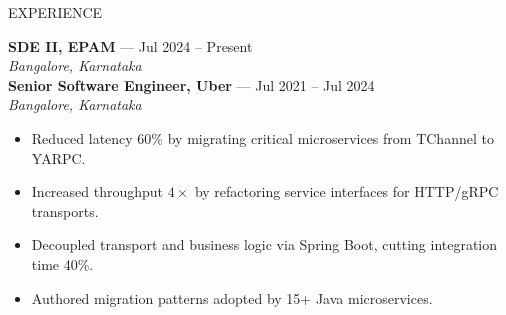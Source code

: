 \documentclass{resume} %
\begin{document}
\begin{rSection}{EXPERIENCE}

\textbf{SDE II, EPAM} --- Jul 2024 -- Present\\
\textit{Bangalore, Karnataka}\\

\textbf{Senior Software Engineer, Uber} --- Jul 2021 -- Jul 2024\\
\textit{Bangalore, Karnataka}\\
\begin{itemize}
    \itemsep -6pt
    \item Reduced latency 60\% by migrating critical microservices from TChannel to YARPC.
    \item Increased throughput $4\times$ by refactoring service interfaces for HTTP/gRPC transports.
    \item Decoupled transport and business logic via Spring Boot, cutting integration time 40\%.
    \item Authored migration patterns adopted by 15+ Java microservices.
\end{itemize}


\end{rSection}
\end{document}
